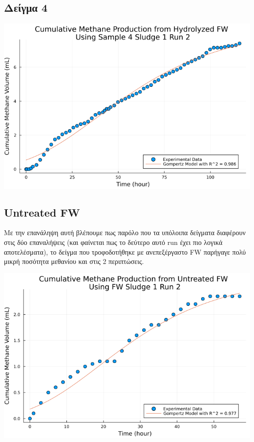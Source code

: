 \documentclass[11pt]{article}
\begin{document}
\subsection{Δείγμα 4}
\label{sec:org8416bdc}
\begin{center}
\includegraphics[width=.9\linewidth]{../plots/BMPs/Hydrolyzed FW/methane_kinetics_hydrolysate_4_s1_r2_hour.png}
\end{center}

\subsection{Untreated FW}
\label{sec:orgefb0307}
Με την επανάληψη αυτή βλέπουμε πως παρόλο που τα υπόλοιπα δείγματα διαφέρουν στις δύο επαναλήψεις (και φαίνεται πως το δεύτερο αυτό run έχει πιο λογικά αποτελέσματα), το δείγμα που τροφοδοτήθηκε με ανεπεξέργαστο FW παρήγαγε πολύ μικρή ποσότητα μεθανίου και στις 2 περιπτώσεις.
\begin{center}
\includegraphics[width=.9\linewidth]{../plots/BMPs/Untreated FW/methane_kinetics_untreated_fw_s1_r2_hour.png}
\end{center}
\end{document}
